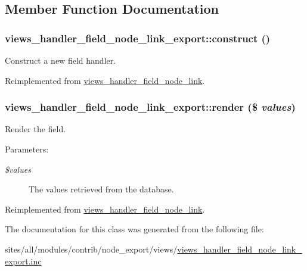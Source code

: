 \subsection{Member Function Documentation}
\hypertarget{classviews__handler__field__node__link__export_1ccad9b1e274a9345a3f167a58e7f997}{
\subsubsection[{construct}]{\setlength{\rightskip}{0pt plus 5cm}views\_\-handler\_\-field\_\-node\_\-link\_\-export::construct ()}}
\label{classviews__handler__field__node__link__export_1ccad9b1e274a9345a3f167a58e7f997}


Construct a new field handler. 

Reimplemented from \hyperlink{classviews__handler__field__node__link_c3f643ba7dd0435fc03c7bf477907484}{views\_\-handler\_\-field\_\-node\_\-link}.\hypertarget{classviews__handler__field__node__link__export_84502b9c08a9b0fa22eb914b278d1a4f}{
\subsubsection[{render}]{\setlength{\rightskip}{0pt plus 5cm}views\_\-handler\_\-field\_\-node\_\-link\_\-export::render (\$ {\em values})}}
\label{classviews__handler__field__node__link__export_84502b9c08a9b0fa22eb914b278d1a4f}


Render the field.

\begin{Desc}
\item[Parameters:]
\begin{description}
\item[{\em \$values}]The values retrieved from the database. \end{description}
\end{Desc}


Reimplemented from \hyperlink{classviews__handler__field__node__link_9621ff38a6b318eb94f0c44fa2f711f5}{views\_\-handler\_\-field\_\-node\_\-link}.

The documentation for this class was generated from the following file:\begin{CompactItemize}
\item 
sites/all/modules/contrib/node\_\-export/views/\hyperlink{views__handler__field__node__link__export_8inc}{views\_\-handler\_\-field\_\-node\_\-link\_\-export.inc}\end{CompactItemize}
